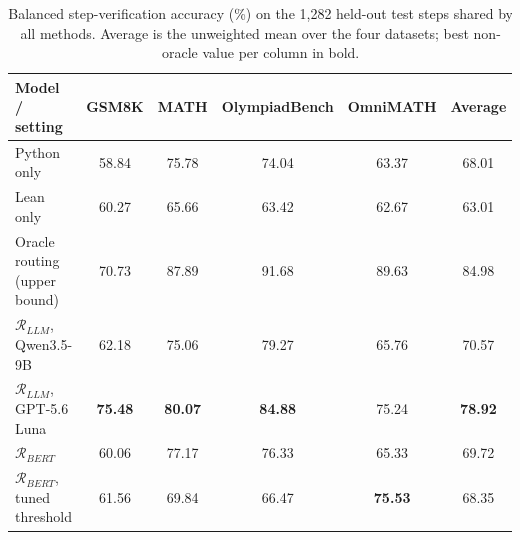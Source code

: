 \begin{table}[ht]
\centering
\begin{tabular}{lccccc}
\hline
\textbf{Model / setting} & \textbf{GSM8K} & \textbf{MATH} & \textbf{OlympiadBench} & \textbf{OmniMATH} & \textbf{Average} \\
\hline
Python only & 58.84 & 75.78 & 74.04 & 63.37 & 68.01 \\
Lean only & 60.27 & 65.66 & 63.42 & 62.67 & 63.01 \\
Oracle routing (upper bound) & 70.73 & 87.89 & 91.68 & 89.63 & 84.98 \\
\midrule
$\mathcal{R}_{LLM}$, Qwen3.5-9B & 62.18 & 75.06 & 79.27 & 65.76 & 70.57 \\
$\mathcal{R}_{LLM}$, GPT-5.6 Luna & \textbf{75.48} & \textbf{80.07} & \textbf{84.88} & 75.24 & \textbf{78.92} \\
$\mathcal{R}_{BERT}$ & 60.06 & 77.17 & 76.33 & 65.33 & 69.72 \\
$\mathcal{R}_{BERT}$, tuned threshold & 61.56 & 69.84 & 66.47 & \textbf{75.53} & 68.35 \\
\hline
\end{tabular}
\caption{Balanced step-verification accuracy (\%) on the 1,282 held-out test steps shared by all methods. Average is the unweighted mean over the four datasets; best non-oracle value per column in bold.}
\label{tab:test_split_results}
\end{table}
